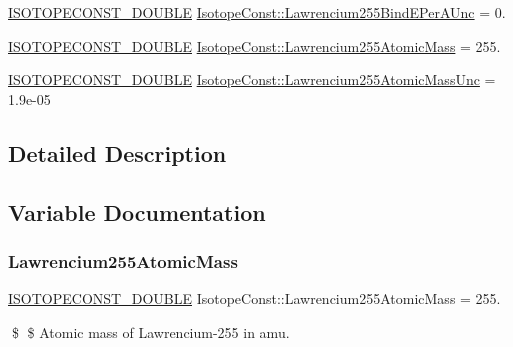 \begin{DoxyCompactItemize}
\mbox{\hyperlink{group___isotope_const-_macros_ga8f45a7272ce02c0b4c65c44636ed719a}{I\+S\+O\+T\+O\+P\+E\+C\+O\+N\+S\+T\+\_\+\+D\+O\+U\+B\+LE}} \mbox{\hyperlink{group___isotope_const-_lawrencium-_lr255_ga29c551a19650342ae5805c5b38da22f7}{Isotope\+Const\+::\+Lawrencium255\+Bind\+E\+Per\+A\+Unc}} = 0.
\item 
\mbox{\hyperlink{group___isotope_const-_macros_ga8f45a7272ce02c0b4c65c44636ed719a}{I\+S\+O\+T\+O\+P\+E\+C\+O\+N\+S\+T\+\_\+\+D\+O\+U\+B\+LE}} \mbox{\hyperlink{group___isotope_const-_lawrencium-_lr255_gaad8cf12fd96465d8df21ee4febe6af46}{Isotope\+Const\+::\+Lawrencium255\+Atomic\+Mass}} = 255.
\item 
\mbox{\hyperlink{group___isotope_const-_macros_ga8f45a7272ce02c0b4c65c44636ed719a}{I\+S\+O\+T\+O\+P\+E\+C\+O\+N\+S\+T\+\_\+\+D\+O\+U\+B\+LE}} \mbox{\hyperlink{group___isotope_const-_lawrencium-_lr255_ga5c20da50ff0902c69a1a6da813d83855}{Isotope\+Const\+::\+Lawrencium255\+Atomic\+Mass\+Unc}} = 1.\+9e-\/05
\end{DoxyCompactItemize}


\subsection{Detailed Description}


\subsection{Variable Documentation}
\mbox{\label{group___isotope_const-_lawrencium-_lr255_gaad8cf12fd96465d8df21ee4febe6af46}} 
\subsubsection{\texorpdfstring{Lawrencium255\+Atomic\+Mass}{Lawrencium255AtomicMass}}
{\footnotesize\ttfamily \mbox{\hyperlink{group___isotope_const-_macros_ga8f45a7272ce02c0b4c65c44636ed719a}{I\+S\+O\+T\+O\+P\+E\+C\+O\+N\+S\+T\+\_\+\+D\+O\+U\+B\+LE}} Isotope\+Const\+::\+Lawrencium255\+Atomic\+Mass = 255.}

\$ \$ Atomic mass of Lawrencium-\/255 in amu. \mbox{\label{group___isotope_const-_lawrencium-_lr255_ga5c20da50ff0902c69a1a6da813d83855}} 

